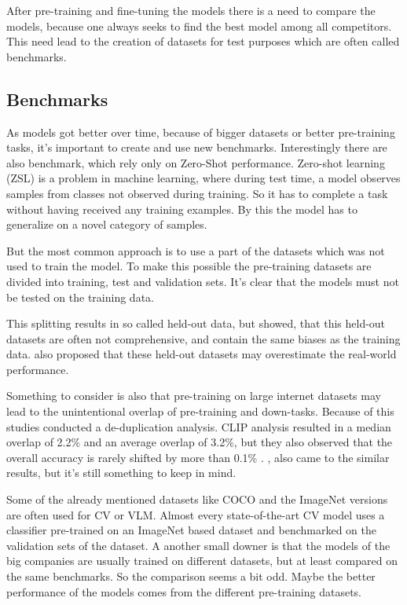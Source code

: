 \documentclass[
]{krantz}
\begin{document}
After pre-training and fine-tuning the models there is a need to compare the models, because one always seeks to find the best model among all competitors. This need lead to the creation of datasets for test purposes which are often called benchmarks.

\hypertarget{benchmarks}{%
\subsection{Benchmarks}\label{benchmarks}}

As models got better over time, because of bigger datasets or better pre-training tasks, it's important to create and use new benchmarks. Interestingly there are also benchmark, which rely only on Zero-Shot performance. Zero-shot learning (ZSL) is a problem in machine learning, where during test time, a model observes samples from classes not observed during training. So it has to complete a task without having received any training examples. By this the model has to generalize on a novel category of samples.

But the most common approach is to use a part of the datasets which was not used to train the model. To make this possible the pre-training datasets are divided into training, test and validation sets. It's clear that the models must not be tested on the training data.

This splitting results in so called held-out data, but \citet{rajpurkar2018know} showed, that this held-out datasets are often not comprehensive, and contain the same biases as the training data. \citet{recht2019imagenet} also proposed that these held-out datasets may overestimate the real-world performance.

Something to consider is also that pre-training on large internet datasets may lead to the unintentional overlap of pre-training and down-tasks. Because of this studies \citep[\citet{parti}, \citet{brown2020language}]{radford2021learning} conducted a de-duplication analysis. CLIP analysis resulted in a median overlap of 2.2\% and an average overlap of 3.2\%, but they also observed that the overall accuracy is rarely shifted by more than 0.1\% \citep{radford2021learning}. \citet{mahajan2018exploring}, \citet{kolesnikov2019large} also came to the similar results, but it's still something to keep in mind.

Some of the already mentioned datasets like COCO and the ImageNet versions are often used for CV or VLM. Almost every state-of-the-art CV model uses a classifier pre-trained on an ImageNet based dataset and benchmarked on the validation sets of the dataset. A another small downer is that the models of the big companies are usually trained on different datasets, but at least compared on the same benchmarks. So the comparison seems a bit odd. Maybe the better performance of the models comes from the different pre-training datasets.
\end{document}
